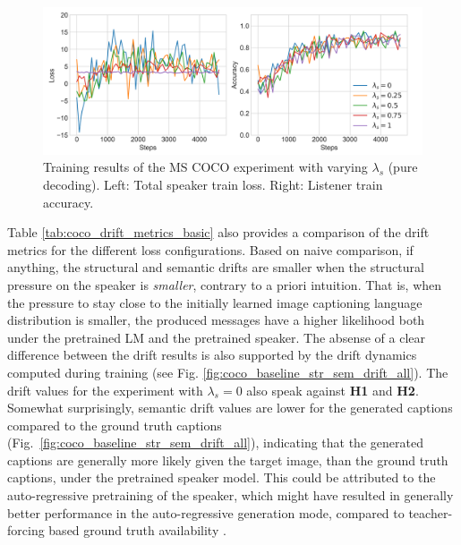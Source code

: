 \begin{figure}
	\centering
	\includegraphics[width=\linewidth]{images/coco_refgame_4000_pure_all_Ls_random.png}
	\caption{Training results of the MS COCO experiment with varying $\lambda_s$ (pure decoding). Left: Total speaker train loss. Right: Listener train accuracy.}
	\label{fig:coco_baseline_speaker_loss_listener_acc_all}
\end{figure}

Table \ref{tab:coco_drift_metrics_basic} also provides a comparison of the drift metrics for the different loss configurations. Based on naive comparison, if anything, the structural and semantic drifts are smaller when the structural pressure on the speaker is \emph{smaller}, contrary to a priori intuition. That is, when the pressure to stay close to the initially learned image captioning language distribution is smaller, the produced messages have a higher likelihood both under the pretrained LM and the pretrained speaker. The absense of a clear difference between the drift results is also supported by the drift dynamics computed during training (see Fig. \ref{fig:coco_baseline_str_sem_drift_all}). 
The drift values for the experiment with $\lambda_s = 0$ also speak against \textbf{H1} and \textbf{H2}. Somewhat surprisingly, semantic drift values are lower for the generated captions compared to the ground truth captions (Fig.~\ref{fig:coco_baseline_str_sem_drift_all}), indicating that the generated captions are generally more likely given the target image, than the ground truth captions, under the pretrained speaker model. This could be attributed to the auto-regressive pretraining of the speaker, which might have resulted in generally better performance in the auto-regressive generation mode, compared to teacher-forcing based ground truth availability .


